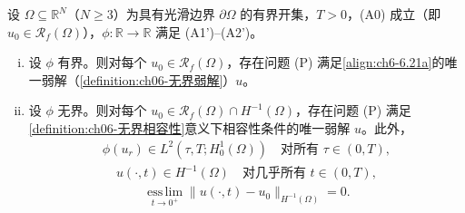 \documentclass[../../main.tex]{subfiles}%
\begin{document}
\begin{theorem}\label{theorem:ch06-6.7.6}
设 $\Omega\subseteq\mathbb{R}^N$（$N\geqslant3$）为具有光滑边界 $\partial\Omega$ 的有界开集，$T>0$，(A0) 成立（即 $u_0\in\mathscr{R}_f(\Omega)$），$\phi:\mathbb{R}\to\mathbb{R}$ 满足 (A1')--(A2')。
\begin{enumerate}[(i)]
\item 设 $\phi$ 有界。则对每个 $u_0\in\mathscr{R}_f(\Omega)$，存在问题 (P) 满足\eqref{align:ch6-6.21a}的唯一弱解（\cref{definition:ch06-无界弱解}）$u$。
\item 设 $\phi$ 无界。则对每个 $u_0\in\mathscr{R}_f(\Omega)\cap H^{-1}(\Omega)$，存在问题 (P) 满足\cref{definition:ch06-无界相容性}意义下相容性条件的唯一弱解 $u$。此外，
\begin{align}
\phi(u_r)\in L^2(\tau,T;H^1_0(\Omega))\quad\text{对所有 }\tau\in(0,T), \label{align:ch6-6.139a}
\end{align}
\begin{align}
u(\cdot,t)\in H^{-1}(\Omega)\quad\text{对几乎所有 }t\in(0,T), \label{align:ch6-6.139b}
\end{align}
\begin{align}
\operatorname*{ess\,lim}_{t\to0^+}\|u(\cdot,t)-u_0\|_{H^{-1}(\Omega)}=0. \label{align:ch6-6.139c}
\end{align}
\end{enumerate}
\end{theorem}
\end{document}
